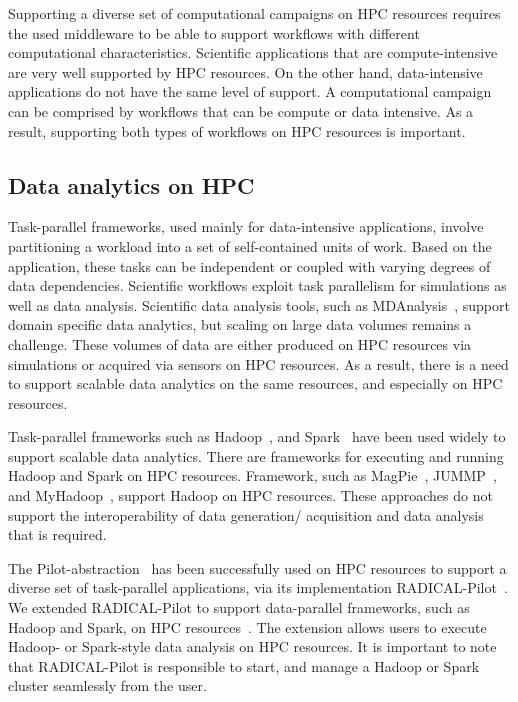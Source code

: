 \label{current_research}
Supporting a diverse set of computational campaigns on HPC resources requires the used middleware to be able to support workflows with different computational characteristics.
Scientific applications that are compute-intensive are very well supported by HPC resources.
On the other hand, data-intensive applications do not have the same level of support.
A computational campaign can be comprised by workflows that can be compute or data intensive.
As a result, supporting both types of workflows on HPC resources is important.

\subsection{Data analytics on HPC}
\label{data_analysis_hpc}
Task-parallel frameworks, used mainly for data-intensive applications, involve partitioning a workload into a set of self-contained units of work. 
Based on the application, these tasks can be independent or coupled with varying degrees of data dependencies. 
Scientific workflows exploit task parallelism for simulations as well as data analysis.
Scientific data analysis tools, such as MDAnalysis~\cite{gowers2016mdanalysis,michaud2011mdanalysis}, support domain specific data analytics, but scaling on large data volumes remains a challenge.
These volumes of data are either produced on HPC resources via simulations or acquired via sensors on HPC resources.
As a result, there is a need to support scalable data analytics on the same resources, and especially on HPC resources.

Task-parallel frameworks such as Hadoop~\cite{hadoop}, and Spark~\cite{zaharia2010spark} have been used widely to support scalable data analytics.
There are frameworks for executing and running Hadoop and Spark on HPC resources.
Framework, such as MagPie~\cite{magpie}, JUMMP~\cite{moody2013jummp}, and MyHadoop~\cite{krishnan04myhadoop}, support Hadoop on HPC resources.
These approaches do not support the interoperability of data generation/ acquisition and data analysis that is required.

The Pilot-abstraction~\cite{luckow2012pstar} has been successfully used on HPC resources to support a diverse set of task-parallel applications, via its implementation RADICAL-Pilot~\cite{merzky2019using}.
We extended RADICAL-Pilot to support data-parallel frameworks, such as Hadoop and Spark, on HPC resources~\cite{luckow2016hadoop}.
The extension allows users to execute Hadoop- or Spark-style data analysis on HPC resources.
It is important to note that RADICAL-Pilot is responsible to start, and manage a Hadoop or Spark cluster seamlessly from the user.

